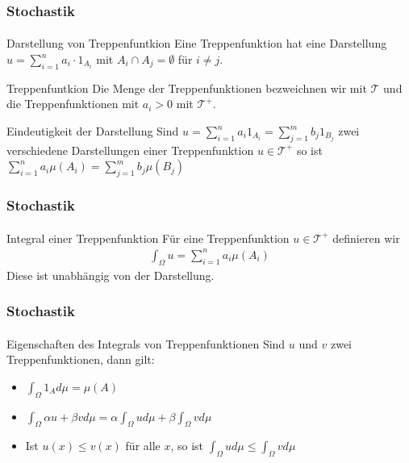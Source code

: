 \documentclass{beamer}
\begin{document}
\begin{frame}
    \frametitle{Stochastik}
\framesubtitle{}
    \begin{block}{Darstellung von Treppenfuntkion}
        Eine Treppenfunktion hat eine Darstellung $u = \sum_{i= 1}^n a_i \cdot  1_{A_i}$ mit $A_i \cap A_j = \emptyset$ für $i \neq j$.
    \end{block}

    \begin{block}{Treppenfuntkion}
        Die Menge der Treppenfunktionen bezweichnen wir mit $\mathcal{T}$ und die Treppenfunktionen mit $a_i > 0$ mit $\mathcal{T}^+$.        
    \end{block}
    
    \begin{block}{Eindeutigkeit der Darstellung}
        Sind $u = \sum_{i= 1}^n a_i 1_{A_i} = \sum_{j= 1}^m b_j 1_{B_j}$ zwei verschiedene Darstellungen einer Treppenfunktion 
        $u \in \mathcal{T}^+$
        so ist $\sum_{i= 1}^n a_i \mu (A_i) = \sum_{j= 1}^m b_j \mu (B_j)$
    \end{block}




\end{frame}


\begin{frame}
    \frametitle{Stochastik}
\framesubtitle{}
    \begin{block}{Integral einer Treppenfunktion}
        Für eine Treppenfunktion $u \in \mathcal{T}^+$ definieren wir
\begin{align*}
    \int_\Omega u = \sum_{i=1}^n a_i \mu(A_i)
\end{align*}
Diese ist unabhängig von der Darstellung.
    \end{block}

\end{frame}


\begin{frame}
    \frametitle{Stochastik}
\framesubtitle{}
\begin{block}{Eigenschaften des Integrals von Treppenfunktionen}
    Sind $u$ und $v$ zwei Treppenfunktionen, dann gilt:
    \begin{itemize}
    \item $\int_{\Omega} 1_A  d\mu  = \mu (A)$  
    \item $\int_{\Omega} \alpha u  + \beta v d\mu = \alpha \int_{\Omega}  u d\mu + \beta  \int_{\Omega}  v d\mu$
    \item Ist $u(x) \leq v(x)$ für alle $x$, so ist $\int_{\Omega} u d\mu \leq \int_{\Omega} v d\mu$ 
    \end{itemize}
    \end{block}
\end{frame}
\end{document}
